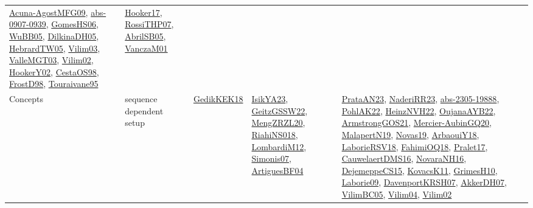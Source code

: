 {\begin{longtable}{lp{3cm}>{\raggedright}p{6cm}>{\raggedright}p{6cm}p{8cm}}
\href{papers/Acuna-AgostMFG09.pdf}{Acuna-AgostMFG09}\cite{Acuna-AgostMFG09}, \href{articles/abs-0907-0939.pdf}{abs-0907-0939}\cite{abs-0907-0939}, \href{papers/GomesHS06.pdf}{GomesHS06}\cite{GomesHS06}, \href{papers/WuBB05.pdf}{WuBB05}\cite{WuBB05}, \href{papers/DilkinaDH05.pdf}{DilkinaDH05}\cite{DilkinaDH05}, \href{papers/HebrardTW05.pdf}{HebrardTW05}\cite{HebrardTW05}, \href{papers/Vilim03.pdf}{Vilim03}\cite{Vilim03}, \href{papers/ValleMGT03.pdf}{ValleMGT03}\cite{ValleMGT03}, \href{papers/Vilim02.pdf}{Vilim02}\cite{Vilim02}, \href{papers/HookerY02.pdf}{HookerY02}\cite{HookerY02}, \href{papers/CestaOS98.pdf}{CestaOS98}\cite{CestaOS98}, \href{papers/FrostD98.pdf}{FrostD98}\cite{FrostD98}, \href{papers/Touraivane95.pdf}{Touraivane95}\cite{Touraivane95} & \href{papers/Hooker17.pdf}{Hooker17}\cite{Hooker17}, \href{papers/RossiTHP07.pdf}{RossiTHP07}\cite{RossiTHP07}, \href{papers/AbrilSB05.pdf}{AbrilSB05}\cite{AbrilSB05}, \href{papers/VanczaM01.pdf}{VanczaM01}\cite{VanczaM01}\\
Concepts & sequence dependent setup & \href{articles/GedikKEK18.pdf}{GedikKEK18}\cite{GedikKEK18} & \href{articles/IsikYA23.pdf}{IsikYA23}\cite{IsikYA23}, \href{papers/GeitzGSSW22.pdf}{GeitzGSSW22}\cite{GeitzGSSW22}, \href{articles/MengZRZL20.pdf}{MengZRZL20}\cite{MengZRZL20}, \href{papers/RiahiNS018.pdf}{RiahiNS018}\cite{RiahiNS018}, \href{articles/LombardiM12.pdf}{LombardiM12}\cite{LombardiM12}, \href{articles/Simonis07.pdf}{Simonis07}\cite{Simonis07}, \href{papers/ArtiguesBF04.pdf}{ArtiguesBF04}\cite{ArtiguesBF04} & \href{articles/PrataAN23.pdf}{PrataAN23}\cite{PrataAN23}, \href{articles/NaderiRR23.pdf}{NaderiRR23}\cite{NaderiRR23}, \href{articles/abs-2305-19888.pdf}{abs-2305-19888}\cite{abs-2305-19888}, \href{articles/PohlAK22.pdf}{PohlAK22}\cite{PohlAK22}, \href{articles/HeinzNVH22.pdf}{HeinzNVH22}\cite{HeinzNVH22}, \href{papers/OujanaAYB22.pdf}{OujanaAYB22}\cite{OujanaAYB22}, \href{papers/ArmstrongGOS21.pdf}{ArmstrongGOS21}\cite{ArmstrongGOS21}, \href{papers/Mercier-AubinGQ20.pdf}{Mercier-AubinGQ20}\cite{Mercier-AubinGQ20}, \href{papers/MalapertN19.pdf}{MalapertN19}\cite{MalapertN19}, \href{articles/Novas19.pdf}{Novas19}\cite{Novas19}, \href{papers/ArbaouiY18.pdf}{ArbaouiY18}\cite{ArbaouiY18}, \href{articles/LaborieRSV18.pdf}{LaborieRSV18}\cite{LaborieRSV18}, \href{articles/FahimiOQ18.pdf}{FahimiOQ18}\cite{FahimiOQ18}, \href{papers/Pralet17.pdf}{Pralet17}\cite{Pralet17}, \href{papers/CauwelaertDMS16.pdf}{CauwelaertDMS16}\cite{CauwelaertDMS16}, \href{articles/NovaraNH16.pdf}{NovaraNH16}\cite{NovaraNH16}, \href{papers/DejemeppeCS15.pdf}{DejemeppeCS15}\cite{DejemeppeCS15}, \href{articles/KovacsK11.pdf}{KovacsK11}\cite{KovacsK11}, \href{papers/GrimesH10.pdf}{GrimesH10}\cite{GrimesH10}, \href{papers/Laborie09.pdf}{Laborie09}\cite{Laborie09}, \href{papers/DavenportKRSH07.pdf}{DavenportKRSH07}\cite{DavenportKRSH07}, \href{papers/AkkerDH07.pdf}{AkkerDH07}\cite{AkkerDH07}, \href{articles/VilimBC05.pdf}{VilimBC05}\cite{VilimBC05}, \href{papers/Vilim04.pdf}{Vilim04}\cite{Vilim04}, \href{papers/Vilim02.pdf}{Vilim02}\cite{Vilim02}\\

\end{longtable}}
